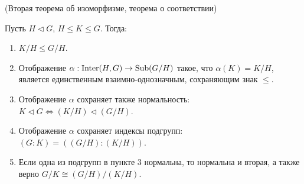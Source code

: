 \begin{theorem}(Вторая теорема об изоморфизме, теорема о соответствии)~

    Пусть $H \vartriangleleft G$, $H \leq K \leq G$. Тогда:
    \begin{enumerate}
        \item $K/H \leq G/H$.
        \item Отображение $\alpha: \operatorname{\text{Inter}}(H, G) \to \text{Sub}(G/H)$ такое, что $\alpha(K) = K/H$, 
        является единственным взаимно-однозначным, сохраняющим знак $\leq$.
        \item Отображение $\alpha$ сохраняет также нормальность: $K \vartriangleleft G 
        \Leftrightarrow (K/H) \vartriangleleft (G/H)$.
        \item Отображение $\alpha$ сохраняет индексы подгрупп: $(G:K) = ((G/H):(K/H))$.
        \item Если одна из подгрупп в пункте 3 нормальна, то нормальна и вторая, а также верно 
        $G/K \cong (G/H)/(K/H)$.
    \end{enumerate}
\end{theorem}

